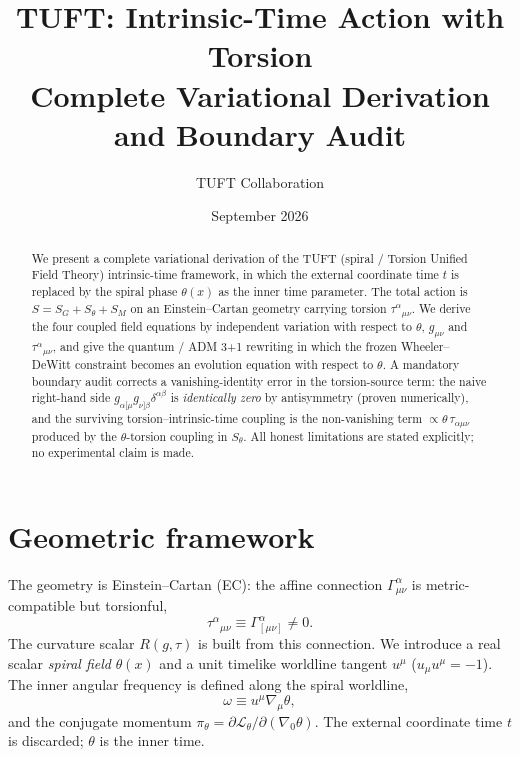 \documentclass[11pt]{article}
\title{TUFT: Intrinsic-Time Action with Torsion\\
\large Complete Variational Derivation and Boundary Audit}
\author{TUFT Collaboration}
\date{September 2026}
\newcommand{\beq}{\begin{equation}}
\newcommand{\eeq}{\end{equation}}
\begin{document}
\maketitle

\begin{abstract}
We present a complete variational derivation of the TUFT (spiral / Torsion Unified Field Theory)
intrinsic-time framework, in which the external coordinate time $t$ is replaced by the spiral
phase $\theta(x)$ as the inner time parameter. The total action is
$S=S_G+S_\theta+S_M$ on an Einstein--Cartan geometry carrying torsion
$\tau^\alpha{}_{\mu\nu}$. We derive the four coupled field equations by independent variation
with respect to $\theta$, $g_{\mu\nu}$ and $\tau^\alpha{}_{\mu\nu}$, and give the
quantum / ADM 3+1 rewriting in which the frozen Wheeler--DeWitt constraint becomes an
evolution equation with respect to $\theta$. A mandatory boundary audit corrects a
vanishing-identity error in the torsion-source term: the naive right-hand side
$g_{\alpha[\mu}g_{\nu]\beta}\delta^{\alpha\beta}$ is \emph{identically zero} by
antisymmetry (proven numerically), and the surviving torsion--intrinsic-time coupling is the
non-vanishing term $\propto \theta\,\tau_{\alpha\mu\nu}$ produced by the $\theta$-torsion
coupling in $S_\theta$. All honest limitations are stated explicitly; no experimental claim
is made.
\end{abstract}

\section{Geometric framework}
\label{sec:frame}
The geometry is Einstein--Cartan (EC): the affine connection
$\Gamma^\alpha_{\mu\nu}$ is metric-compatible but torsionful,
\beq
\tau^\alpha{}_{\mu\nu} \equiv \Gamma^\alpha_{[\mu\nu]} \neq 0 .
\eeq
The curvature scalar $R(g,\tau)$ is built from this connection. We introduce a real scalar
\emph{spiral field} $\theta(x)$ and a unit timelike worldline tangent $u^\mu$
($u_\mu u^\mu=-1$). The inner angular frequency is defined along the spiral worldline,
\beq
\omega \equiv u^\mu \nabla_\mu \theta ,
\eeq
and the conjugate momentum $\pi_\theta = \partial\mathcal{L}_\theta/\partial(\nabla_0\theta)$.
The external coordinate time $t$ is discarded; $\theta$ is the inner time.
\end{document}
